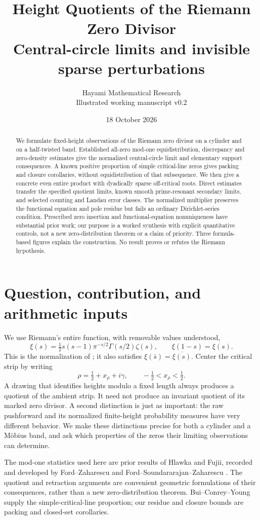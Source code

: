 \documentclass[11pt,a4paper]{article}
\title{Height Quotients of the Riemann Zero Divisor\\[3pt]
\large Central-circle limits and invisible sparse perturbations}
\author{Hayami Mathematical Research\\\small Illustrated working manuscript v0.2}
\date{18 October 2026}
\theoremstyle{definition}
\theoremstyle{remark}
\begin{document}
\maketitle
\begin{abstract}
We formulate fixed-height observations of the Riemann zero divisor on a
cylinder and on a half-twisted band. Established all-zero mod-one
 equidistribution, discrepancy and zero-density estimates give the normalized
central-circle limit and elementary support consequences. A known positive
proportion of simple critical-line zeros gives packing and closure
corollaries, without equidistribution of that subsequence. We then give a
concrete even entire product with dyadically sparse off-critical roots.
Direct estimates transfer the specified quotient limits, known smooth
prime-resonant secondary limits, and selected counting and Landau error
classes. The normalized multiplier preserves the functional equation and
pole residue but fails an ordinary Dirichlet-series condition. Prescribed
zero insertion and functional-equation nonuniqueness have substantial prior
work; our purpose is a worked synthesis with explicit quantitative controls,
not a new zero-distribution theorem or a claim of priority. Three
formula-based figures explain the construction. No result proves or refutes
the Riemann hypothesis.
\end{abstract}

\section{Question, contribution, and arithmetic inputs}

We use Riemann's entire function, with removable values understood,
\[
 \xi(s)=\tfrac12s(s-1)\pi^{-s/2}\Gamma(s/2)\zeta(s),
 \qquad \xi(1-s)=\xi(s).
\]
This is the normalization of \cite[25.4.3--25.4.4]{DLMF}; it also satisfies
$\xi(\bar s)=\overline{\xi(s)}$.
Center the critical strip by writing
\[
 \rho=\tfrac12+x_\rho+i\gamma,\qquad -\tfrac12<x_\rho<\tfrac12.
\]
A drawing that identifies heights modulo a fixed length always produces a
quotient of the ambient strip. It need not produce an invariant quotient of
its marked zero divisor. A second distinction is just as important: the raw
pushforward and its normalized finite-height probability measures have very
different behavior. We make these distinctions precise for both a cylinder
and a M\"obius band, and ask which properties of the zeros their limiting
observations can determine.

The mod-one statistics used here are prior results of Hlawka and Fujii,
recorded and developed by Ford--Zaharescu and
Ford--Soundararajan--Zaharescu \cite{FZ,FSZ}. The quotient and retraction
arguments are convenient geometric formulations of their consequences,
rather than a new zero-distribution theorem. Bui--Conrey--Young \cite{BCY}
supply the simple-critical-line proportion; our residue and closure bounds
are packing and closed-set corollaries.
\end{document}
